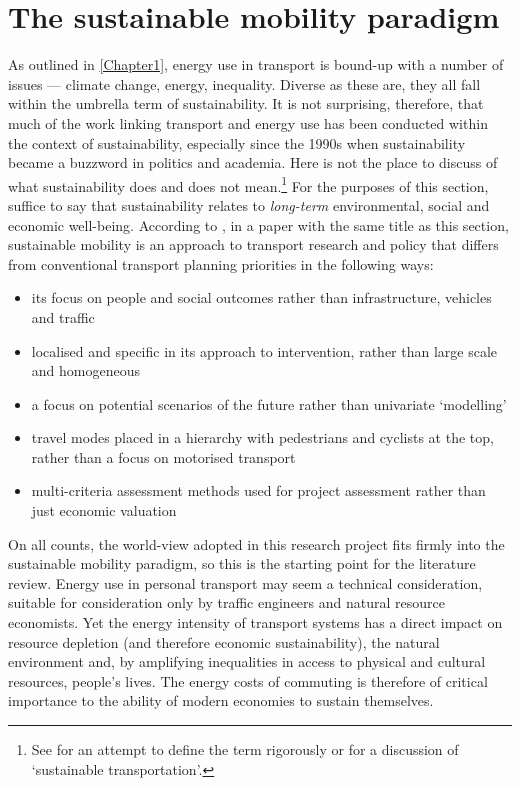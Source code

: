 \section{The sustainable mobility paradigm} \label{ssus}
As outlined in \cref{Chapter1}, energy use in transport is bound-up with a
number of issues --- climate change, energy, inequality.
Diverse as these are, they all fall within
the umbrella term of sustainability. It is not surprising, therefore, that much
of the work linking transport and energy use has been conducted within the context of
sustainability, especially since the 1990s when sustainability became a buzzword
in politics and academia. Here is not the place to discuss
of what sustainability does and does not mean.\footnote{See \citep{Pezzey1997} for an
attempt to define the term rigorously or \citep{Steg2005} for a discussion
of `sustainable transportation'.
}
For the purposes of this section, suffice to
say that sustainability relates to \emph{long-term} environmental, social and
economic well-being. According to \citet{Banister2008}, in a paper with the
same title as this section, sustainable mobility is an approach to transport
research and policy that differs from conventional transport planning priorities
in the following ways:
\begin{itemize}
 \item its focus on people and social outcomes rather than infrastructure,
 vehicles and traffic
 \item localised and specific in its approach to intervention, rather than large
 scale and homogeneous
 \item a focus on potential scenarios of the future rather than univariate `modelling'
 \item travel modes placed in a hierarchy with pedestrians and cyclists at the top,
 rather than a focus on motorised transport
 \item multi-criteria assessment methods used for project assessment
 rather than just economic valuation
\end{itemize}
On all counts, the world-view adopted in this research project
fits firmly into the sustainable mobility
paradigm, so this is the starting point for the literature review. Energy use
in personal transport may seem a technical consideration, suitable for consideration
only by traffic engineers and natural resource economists. Yet the energy intensity
of transport systems has a direct impact on resource depletion (and therefore
economic sustainability), the natural environment and, by amplifying inequalities
in access to physical and cultural resources, people's lives.
The energy costs of commuting is therefore of critical importance to
the ability of modern economies to sustain themselves.

